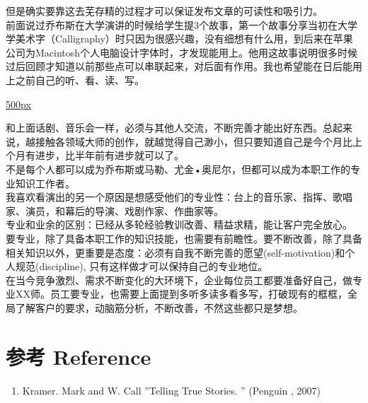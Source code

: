 但是确实要靠这去芜存精的过程才可以保证发布文章的可读性和吸引力。\\
前面说过乔布斯在大学演讲的时候给学生提3个故事，第一个故事分享当初在大学学美术字（Calligraphy）时只因为很感兴趣，没有细想有什么用，到后来在苹果公司为Macintosh个人电脑设计字体时，才发现能用上。他用这故事说明很多时候过后回顾才知道以前那些点可以串联起来，对后面有作用。我也希望能在日后能用上之前自己的听、看、读、写。

\href{文件:25A图1.jpg}{500px}

和上面话剧、音乐会一样，必须与其他人交流，不断完善才能出好东西。总起来说，越接触各领域大师的创作，就越觉得自己渺小，但只要知道自己是今个月比上个月有进步，比半年前有进步就可以了。\\
不是每个人都可以成为乔布斯或马勒、尤金•奥尼尔，但都可以成为本职工作的专业知识工作者。\\
我喜欢看演出的另一个原因是想感受他们的专业性：台上的音乐家、指挥、歌唱家、演员，和幕后的导演、戏剧作家、作曲家等。\\
专业和业余的区别：已经从多轮经验教训改善、精益求精，能让客户完全放心。\\
要专业，除了具备本职工作的知识技能，也需要有前瞻性。要不断改善，除了具备相关知识以外，更重要是态度：必须有自我不断完善的愿望(self-motivation)和个人规范(discipline),
只有这样做才可以保持自己的专业地位。\\
在当今竞争激烈、需求不断变化的大环境下，企业每位员工都要准备好自己，做专业XX师。员工要专业，也需要上面提到多听多读多看多写，打破现有的框框，全局了解客户的要求，动脑筋分析，不断改善，不然这些都只是梦想。

\hypertarget{ux53c2ux8003-reference}{%
\section{参考 Reference}\label{ux53c2ux8003-reference}}

\begin{enumerate}
\tightlist
\item
  Kramer. Mark and W. Call ''Telling True Stories. '' (Penguin , 2007)\\
\end{enumerate}


